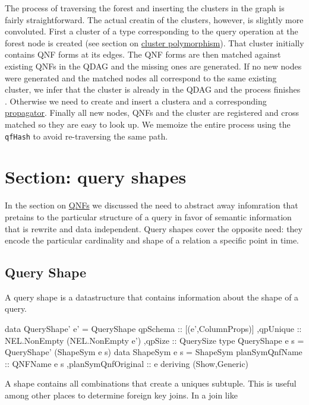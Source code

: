 The process of traversing the forest and inserting the clusters in the
graph is fairly straightforward. The actual creatin of the clusters,
however, is slightly more convoluted. First a cluster of a type
corresponding to the query operation at the forest node is created
(see section on \hyperref[sec:orgadee761]{cluster polymorphism}). That cluster initially contains
QNF forms at its edges. The QNF forms are then matched against
existing QNFs in the QDAG and the missing ones are generated. If no
new nodes were generated and the matched nodes all correspond to the
same existing cluster, we infer that the cluster is already in the
QDAG and the process finishes . Otherwise we need to create and insert
a clustera and a corresponding \hyperref[sec:org089acdd]{propagator}. Finally all new nodes, QNFs
and the cluster are registered and cross matched so they are easy to
look up. We memoize the entire process using the \texttt{qfHash} to avoid
re-traversing the same path.




\section{Section: query shapes}
\label{sec:org2633f87}
In the section on \hyperref[sec:org9e7f455]{QNFs} we discussed the need to abstract away
infomration that pretains to the particular structure of a query in
favor of semantic information that is rewrite and data
independent. Query shapes cover the opposite need: they encode the
particular cardinality and shape of a relation a specific point in
time.

\subsection{Query Shape}
\label{sec:org17d410b}
A query shape is a datastructure that contains information about the
shape  of a query.

\begin{haskell}
  data QueryShape' e' =
  QueryShape
  { qpSchema :: [(e',ColumnProps)]
    ,qpUnique :: NEL.NonEmpty (NEL.NonEmpty e')
    ,qpSize :: QuerySize
  }
  type QueryShape e s = QueryShape' (ShapeSym e s)
  data ShapeSym e s =
  ShapeSym { planSymQnfName :: QNFName e s
    ,planSymQnfOriginal :: e
  }
  deriving (Show,Generic)
\end{haskell}

A shape contains all combinations that create a uniques subtuple. This
is useful among other places to determine foreign key joins. In a join
like

